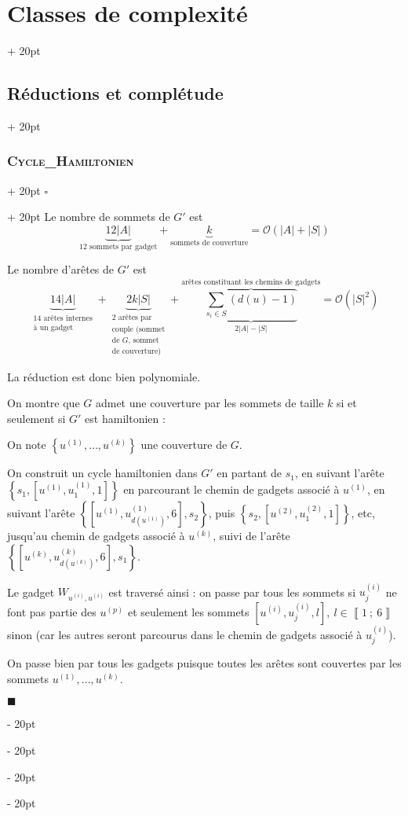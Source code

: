 \documentclass[a4paper, 12pt, twoside]{article}
\newcommand{\nset}[2]{\left\llbracket #1\ ;\ #2 \right\rrbracket}
\newcommand{\set}[1]{\left\{ #1 \right\}}
\newcommand{\abs}[1]{\left\lvert #1 \right\rvert}
\newcommand{\ind}[1][20pt]{\advance\leftskip + #1}
\newcommand{\deind}[1][20pt]{\advance\leftskip - #1}
\newenvironment{indt}[2][20pt]{#2 \par \ind[#1]}{\par \deind} %
\newenvironment{proof}[1][{}]{\begin{indt}{$\square$ #1}}{$\blacksquare$ \end{indt}}
\begin{document}
\begin{indt}{\section{Classes de complexité}}
\begin{indt}{\subsection{Réductions et complétude}}
\begin{indt}{\subsubsection{\textsc{Cycle\_Hamiltonien}}}
\begin{proof}
                    Le nombre de sommets de $G'$ est
                    \[
                        \underbrace{12\abs A}_{\text{12 sommets par gadget}}
                        + \underbrace{k}_{\text{sommets de couverture}}
                        = \mathcal O(\abs A + \abs S)
                    \]

                    Le nombre d'arêtes de $G'$ est
                    \[
                        \underbrace{14\abs A}_{\substack{\text{14 arêtes internes} \\ \text{à un gadget}}}
                        + \underbrace{2k\abs S}_{\substack{\text{2 arêtes par} \\ \text{couple (sommet} \\ \text{de $G$, sommet} \\ \text{de couverture)}}}
                        + \displaystyle \overbrace{\underbrace{\sum_{s_i \in S} (d(u) - 1)}_{2\abs A - \abs S}}^{\text{arêtes constituant les chemins de gadgets}}
                        = \mathcal O(\abs S ^2)
                    \]

                    La réduction est donc bien polynomiale.

                    On montre que $G$ admet une couverture par les sommets de taille $k$ si et seulement si $G'$ est hamiltonien :

                    \vspace{6pt}
                    
                    \boxed{\Rightarrow} On note $\set{u^{(1)}, \ldots, u^{(k)}}$ une couverture de $G$.

                    On construit un cycle hamiltonien dans $G'$ en partant de $s_1$, en suivant l'arête $\set{s_1, [u^{(1)}, u_1^{(1)}, 1]}$ en parcourant le chemin de gadgets associé à $u^{(1)}$, en suivant l'arête $\set{[u^{(1)}, u_{d(u^{(1)})}^{(1)}, 6], s_2}$, puis $\set{s_2, [u^{(2)}, u_1^{(2)}, 1]}$, etc, jusqu'au chemin de gadgets associé à $u^{(k)}$, suivi de l'arête $\set{[u^{(k)}, u_{d(u^{(k)})}^{(k)}, 6], s_1}$.

                    Le gadget $W_{u^{(i)}, u^{(i)}}$ est traversé ainsi : on passe par tous les sommets si $u_j^{(i)}$ ne font pas partie des $u^{(p)}$ et seulement les sommets $[u^{(i)}, u_j^{(i)}, l],\ l \in \nset 1 6$ sinon (car les autres seront parcourus dans le chemin de gadgets associé à $u_j^{(i)}$).

                    On passe bien par tous les gadgets puisque toutes les arêtes sont couvertes par les sommets $u^{(1)}, \ldots, u^{(k)}$.


\end{proof}
\end{indt}
\end{indt}
\end{indt}
\end{document}
